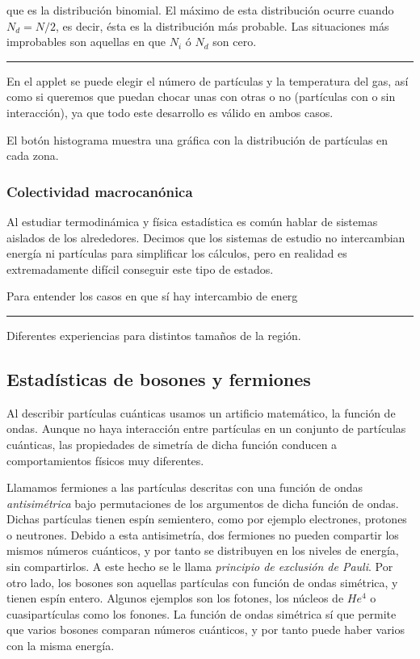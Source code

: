 \documentclass[11pt, a4paper]{article} %
\theoremstyle{named}
\begin{document}
            que es la distribución binomial. El máximo de esta distribución ocurre cuando $N_d = N/2$, es decir, ésta es la distribución más probable. Las situaciones más improbables son aquellas en que $N_i$ ó $N_d$ son cero.

            \noindent\rule{\linewidth}{0.4pt}

            En el applet se puede elegir el número de partículas y la temperatura del gas, así como si queremos que puedan chocar unas con otras o no (partículas con o sin interacción), ya que todo este desarrollo es válido en ambos casos.

            El botón histograma muestra una gráfica con la distribución de partículas en cada zona.

        \subsubsection{Colectividad macrocanónica}\label{sec:macrocanonica}

            Al estudiar termodinámica y física estadística es común hablar de sistemas aislados de los alrededores. Decimos que los sistemas de estudio no intercambian energía ni partículas para simplificar los cálculos, pero en realidad es extremadamente difícil conseguir este tipo de estados.

            Para entender los casos en que sí hay intercambio de energ

            \noindent\rule{\linewidth}{0.4pt}

            Diferentes experiencias para distintos tamaños de la región.

    \newpage
    \subsection{Estadísticas de bosones y fermiones}\label{sec:bosefermi}

        Al describir partículas cuánticas usamos un artificio matemático, la función de ondas. Aunque no haya interacción entre partículas en un conjunto de partículas cuánticas, las propiedades de simetría de dicha función conducen a comportamientos físicos muy diferentes.

        Llamamos fermiones a las partículas descritas con una función de ondas \textit{antisimétrica} bajo permutaciones de los argumentos de dicha función de ondas. Dichas partículas tienen espín semientero, como por ejemplo electrones, protones o neutrones. Debido a esta antisimetría, dos fermiones no pueden compartir los mismos números cuánticos, y por tanto se distribuyen en los niveles de energía, sin compartirlos. A este hecho se le llama \textit{principio de exclusión de Pauli}. Por otro lado, los bosones son aquellas partículas con función de ondas simétrica, y tienen espín entero. Algunos  ejemplos son los fotones, los núcleos de $He^4$ o cuasipartículas como los fonones. La función de ondas simétrica sí que permite que varios bosones comparan números cuánticos, y por tanto puede haber varios con la misma energía.
\end{document}
